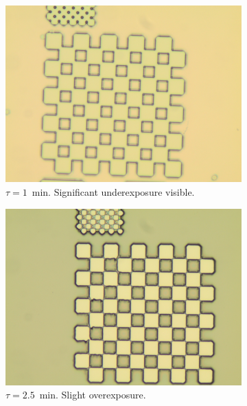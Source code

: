 \begin{figure}[!b]
    \centering
    \begin{subfigure}[t]{0.3\linewidth}
        \centering
        \includegraphics[width=\textwidth]{data/b3d1.jpg}
        \caption{$\tau = 1$~min. Significant underexposure visible.}
        \label{fig:b3d1}
    \end{subfigure}
    \hfill
    \begin{subfigure}[t]{0.3\linewidth}
        \centering
        \includegraphics[width=\textwidth]{data/b3e1.jpg}
        \caption{$\tau = 2.5$~min. Slight overexposure.}
        \label{fig:b3e1}
    \end{subfigure}
    \hfill
    \begin{subfigure}[t]{0.3\linewidth}

\end{subfigure}
\end{figure}
